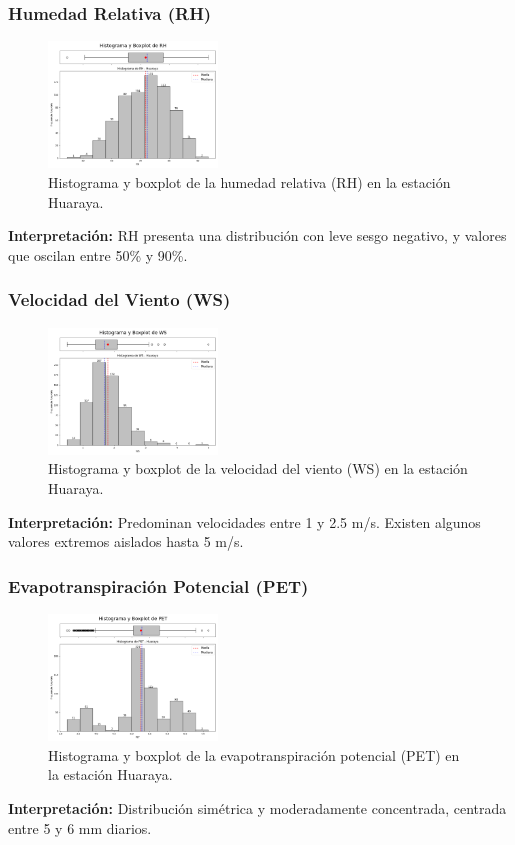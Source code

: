 \subsubsection*{Humedad Relativa (RH)}
\begin{figure}[H]
\centering
\includegraphics[width=0.4\textwidth]{resultados/por_estacion_meteorologica/Huaraya/RH_histograma.png}
\caption{Histograma y boxplot de la humedad relativa (RH) en la estación Huaraya.}
\label{fig:huaraya_RH}
\end{figure}
\textbf{Interpretación:} RH presenta una distribución con leve sesgo negativo, y valores que oscilan entre 50\% y 90\%.

\subsubsection*{Velocidad del Viento (WS)}
\begin{figure}[H]
\centering
\includegraphics[width=0.4\textwidth]{resultados/por_estacion_meteorologica/Huaraya/WS_histograma.png}
\caption{Histograma y boxplot de la velocidad del viento (WS) en la estación Huaraya.}
\label{fig:huaraya_WS}
\end{figure}
\textbf{Interpretación:} Predominan velocidades entre 1 y 2.5 m/s. Existen algunos valores extremos aislados hasta 5 m/s.

\subsubsection*{Evapotranspiración Potencial (PET)}
\begin{figure}[H]
\centering
\includegraphics[width=0.4\textwidth]{resultados/por_estacion_meteorologica/Huaraya/PET_histograma.png}
\caption{Histograma y boxplot de la evapotranspiración potencial (PET) en la estación Huaraya.}
\label{fig:huaraya_PET}
\end{figure}
\textbf{Interpretación:} Distribución simétrica y moderadamente concentrada, centrada entre 5 y 6 mm diarios.


